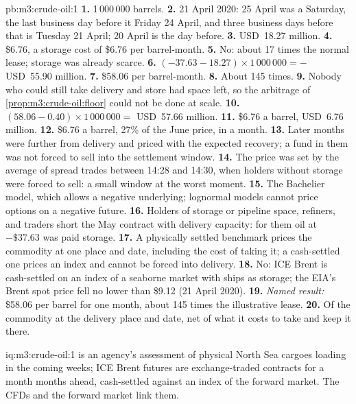 \begin{solution}{pb:m3:crude-oil:1}
\textbf{1.} 1\,000\,000 barrels. \textbf{2.} 21 April 2020: 25 April was a
Saturday, the last business day before it Friday 24 April, and three business days
before that is Tuesday 21 April; 20 April is the day before. \textbf{3.} USD~18.27
million. \textbf{4.} \$6.76, a storage cost of \$6.76 per barrel-month. \textbf{5.}
No: about 17 times the normal lease; storage was already scarce.
\textbf{6.} $(-37.63 - 18.27) \times 1\,000\,000 = -$USD~55.90 million.
\textbf{7.} \$58.06 per barrel-month. \textbf{8.} About 145 times. \textbf{9.}
Nobody who could still take delivery and store had space left, so the arbitrage of
\cref{prop:m3:crude-oil:floor} could not be done at scale. \textbf{10.}
$(58.06 - 0.40) \times 1\,000\,000 = $ USD~57.66 million.
\textbf{11.} \$6.76 a barrel, USD~6.76 million. \textbf{12.} \$6.76 a barrel, 27\%
of the June price, in a month. \textbf{13.} Later months were further from delivery
and priced with the expected recovery; a fund in them was not forced to sell into the
settlement window. \textbf{14.} The price was set by the average of spread trades
between 14:28 and 14:30, when holders without storage were forced to sell: a small
window at the worst moment. \textbf{15.} The Bachelier model, which allows a negative
underlying; lognormal models cannot price options on a negative future.
\textbf{16.} Holders of storage or pipeline space, refiners, and traders short the
May contract with delivery capacity: for them oil at $-\$37.63$ was paid storage.
\textbf{17.} A physically settled benchmark prices the commodity at one place and
date, including the cost of taking it; a cash-settled one prices an index and cannot
be forced into delivery. \textbf{18.} No: ICE Brent is cash-settled on an index of a
seaborne market with ships as storage; the EIA's Brent spot price fell no lower than
\$9.12 (21 April 2020). \textbf{19.} \emph{Named result:} \$58.06 per barrel for one
month, about 145 times the illustrative lease. \textbf{20.} Of the commodity at the
delivery place and date, net of what it costs to take and keep it there.
\end{solution}

\begin{solution}{iq:m3:crude-oil:1}
 is an agency's assessment of physical North Sea cargoes loading in the
coming weeks; ICE Brent futures are exchange-traded contracts for a month months
ahead, cash-settled against an index of the forward market. The CFDs and the forward
market link them.
\end{solution}

